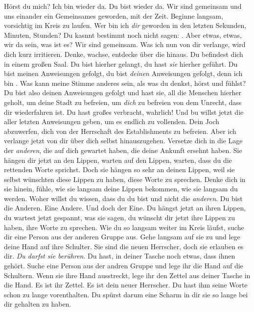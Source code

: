 \documentclass[a4paper, 12pt]{report}
\begin{document}
Hörst du mich? 
Ich bin wieder da. 
Du bist wieder da. 
Wir sind gemeinsam und uns einander ein Gemeinsames geworden, mit der Zeit.
Beginne langsam, vorsichtig im Kreis zu laufen. 
Wer bin ich \emph{dir} geworden in den letzten Sekunden, Minuten, Stunden? 
Du kasnnt bestimmt noch nicht sagen: .
Aber etwas, etwas, wir da sein, was ist es? 
Wir sind gemeinsam.
Was ich nun von dir verlange, wird dich kurz irritieren. 
Denke, wachse, entdecke über die hinaus. 
Du befindest dich in einem großen Saal. 
Du bist hierher gelangt, du hast \emph{sie} hierher geführt. 
Du bist meinen Anweisungen gefolgt, du bist \emph{deinen} Anweisungen gefolgt, denn ich bin . 
Was kann meine Stimme anderes sein, als was du denkst, hörst und fühlst?
Du bist also deinen Anweisungen gefolgt und hast sie, all die Menschen hierher geholt, um deine Stadt zu befreien, um \emph{dich} zu befreien von dem Unrecht, dass dir wiederfahren ist. 
Du hast großes verbracht, wahrlich! 
Und bu willst jetzt die aller letzten Anweisungen geben, um es endlich zu vollenden.
Dein Joch abzuwerfen, dich von der Herrschaft des Establishments zu befreien. 
Aber ich verlange jetzt von dir über dich selbst hinauszugehen. 
Versetze dich in die Lage der \emph{anderen}, die auf dich gewartet haben, die deine Ankunft ersehnt haben.
Sie hängen dir jetzt an den Lippen, warten auf den Lippen, warten, dass du die rettenden Worte sprichst. 
Doch sie hängen so sehr an deinen Lippen, weil sie selbst wünschten diese Lippen zu haben, diese Worte zu sprechen.
Denke dich in sie hinein, fühle, wie sie langsam deine Lippen bekommen, wie sie langsam du werden. 
Woher willst du wissen, dass du du bist und nicht die \emph{anderen}. 
Du bist die Anderen. Eine Andere. Und doch der Eine.
Du hängst jetzt an ihren Lippen, du wartest jetzt gespannt, was sie sagen, du wünscht dir jetzt ihre Lippen zu haben, ihre Worte zu sprechen. 
Wie du so langsam weiter im Kreis läufst, suche dir eine Person aus der anderen Gruppe aus. 
Gehe langsam auf sie zu und lege deine Hand auf ihre Schulter. 
Sie sind die neuen Herrscher, doch sie erlauben es dir. 
\emph{Du darfst sie berühren}. 
Du hast, in deiner Tasche noch etwas, dass ihnen gehört. 
Suche eine Person aus der andren Gruppe und lege ihr die Hand auf die Schultern. 
Wenn sie ihre Hand ausstreckt, lege ihr den Zettel aus deiner Tasche in die Hand. 
Es ist ihr Zettel. 
Es ist dein neuer Herrscher.
Du hast ihm seine Worte schon zu lange vorenthalten.
Du spürst darum eine Scharm in dir sie so lange bei dir gehalten zu haben. 
\end{document}
